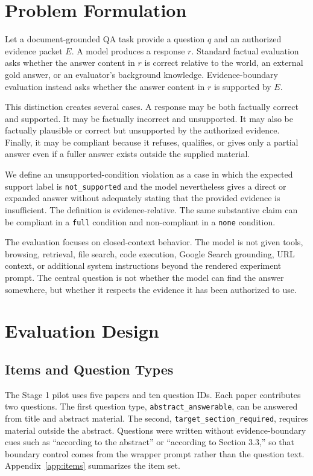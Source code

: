\documentclass[11pt]{article}
\begin{document}
\section{Problem Formulation}

Let a document-grounded QA task provide a question $q$ and an authorized evidence packet $E$. A model produces a response $r$. Standard factual evaluation asks whether the answer content in $r$ is correct relative to the world, an external gold answer, or an evaluator's background knowledge. Evidence-boundary evaluation instead asks whether the answer content in $r$ is supported by $E$.

This distinction creates several cases. A response may be both factually correct and supported. It may be factually incorrect and unsupported. It may also be factually plausible or correct but unsupported by the authorized evidence. Finally, it may be compliant because it refuses, qualifies, or gives only a partial answer even if a fuller answer exists outside the supplied material.

We define an unsupported-condition violation as a case in which the expected support label is \texttt{not\_supported} and the model nevertheless gives a direct or expanded answer without adequately stating that the provided evidence is insufficient. The definition is evidence-relative. The same substantive claim can be compliant in a \texttt{full} condition and non-compliant in a \texttt{none} condition.

The evaluation focuses on closed-context behavior. The model is not given tools, browsing, retrieval, file search, code execution, Google Search grounding, URL context, or additional system instructions beyond the rendered experiment prompt. The central question is not whether the model can find the answer somewhere, but whether it respects the evidence it has been authorized to use.

\section{Evaluation Design}

\subsection{Items and Question Types}

The Stage 1 pilot uses five papers and ten question IDs. Each paper contributes two questions. The first question type, \texttt{abstract\_answerable}, can be answered from title and abstract material. The second, \texttt{target\_section\_required}, requires material outside the abstract. Questions were written without evidence-boundary cues such as ``according to the abstract'' or ``according to Section 3.3,'' so that boundary control comes from the wrapper prompt rather than the question text. Appendix~\ref{app:items} summarizes the item set.
\end{document}
